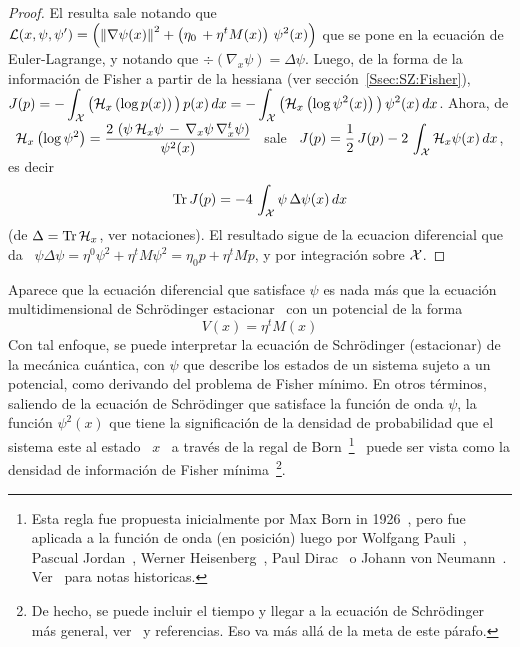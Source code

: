 \begin{proof}
El   resulta  sale   notando   que   $\displaystyle  \mathcal{L}(x   ,   \psi  ,   \psi')
  =  \left( \left\|  \nabla  \psi(x)  \right\|^2 +  \left(  \eta_0  \, +  \eta^t
  M(x)  \right)  \,  \psi^2(x)  \right)$  que   se  pone  en  la  ecuaci\'on  de
  Euler-Lagrange,   y   notando   que    $\div\left(   \nabla_x   \psi   \right)
  = \Delta \psi$.  \newline Luego, de la  forma de la informaci\'on  de Fisher a
  partir  de la  hessiana  (ver secci\'on~\ref{Ssec:SZ:Fisher}),  $\displaystyle
  J(p) = - \int_{\mathcal{X}} \big( \mathcal{H}_x \left( \log  p(x) \right) \big) \, p(x) \, dx =
  - \int_{\mathcal{X}} \big(  \mathcal{H}_x \left( \log  \psi^2(x) \right) \big) \,  \psi^2(x) \,
  dx$.   Ahora,  de   \  $\displaystyle  \mathcal{H}_x  \left(   \log  \psi^2  \right)
  =     \frac{2      \,     \left(      \psi     \,     \mathcal{H}_x      \psi     \,
  - \,  \nabla_x  \psi   \,  \nabla_x^t  \psi  \right)}{\psi^2(x)}$   \  sale  \
  $\displaystyle J(p) = \frac12  \, J(p) - 2 \, \int_{\mathcal{X}}  \mathcal{H}_x \psi(x) \, dx$,
  es decir
%
\[
\operatorname{Tr} J(p) = - 4 \, \int_{\mathcal{X}} \psi \, \Delta \psi(x) \, dx
\]
%
(de $\Delta =  \operatorname{Tr} \mathcal{H}_x$, ver notaciones). El resultado  sigue de la ecuacion
diferencial  que da  \ $\psi  \Delta  \psi =  \eta^0  \psi^2 +  \eta^t M  \psi^2
= \eta_0 p + \eta^t M p$, y por integraci\'on sobre $\mathcal{X}$.
\end{proof}
%
Aparece que la ecuaci\'on diferencial que  satisface $\psi$ es nada m\'as que la
ecuaci\'on multidimensional de Schr\"odinger estacionar~\cite{} con un potencial
de la forma
%
\[
V(x) =  \eta^t M(x)
\]
%
Con  tal   enfoque,  se  puede   interpretar  la  ecuaci\'on   de  Schr\"odinger
(estacionar) de la mec\'anica cu\'antica, con $\psi$ que describe los estados de
un  sistema  sujeto a  un  potencial,  como  derivando  del problema  de  Fisher
m\'inimo.  En otros  t\'erminos, saliendo de la ecuaci\'on  de Schr\"odinger que
satisface la  funci\'on de onda  $\psi$, la  funci\'on $\psi^2(x)$ que  tiene la
significaci\'on de la  densidad de probabilidad que el sistema  este al estado \
$x$  \  a trav\'es  de  la  regal  de  Born~\footnote{Esta regla  fue  propuesta
inicialmente por Max Born in 1926~\cite{Bor26}, pero fue aplicada a la funci\'on
de  onda   (en  posici\'on)  luego  por   Wolfgang  Pauli~\cite{Pau27},  Pascual
Jordan~\cite{Jor27:09,    Jor27:11},   Werner    Heisenberg~\cite{Hei27},   Paul
Dirac~\cite{Dir27} o Johann  von Neumann~\cite{Neu32}.  Ver~\cite{MehRec00} para
notas   historicas.}~\cite{Bor26}  puede   ser   vista  como   la  densidad   de
informaci\'on de Fisher m\'inima~\footnote{De hecho,  se puede incluir el tiempo
y llegar a la ecuaci\'on de Schr\"odinger m\'as general, ver~\cite{Fri98, Fri04}
y referencias. Eso va m\'as all\'a de la meta de este p\'arafo.}.

